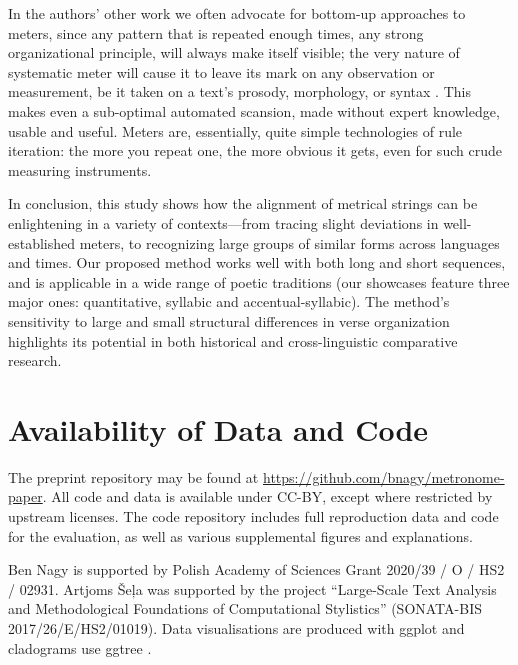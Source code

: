 \documentclass[
    hf
]{ceurart}
\begin{document}
In the authors' other work we often advocate for bottom-up approaches to meters, since any pattern that is repeated enough times, any strong organizational principle, will always make itself visible; the very nature of systematic meter will cause it to leave its mark on any observation or measurement, be it taken on a text's prosody, morphology, or syntax \cite{gasparov_linguistics_2008}. This makes even a sub-optimal automated scansion, made without expert knowledge, usable and useful. Meters are, essentially, quite simple technologies of rule iteration: the more you repeat one, the more obvious it gets, even for such crude measuring instruments.

In conclusion, this study shows how the alignment of metrical strings can be enlightening in a variety of contexts---from tracing slight deviations in well-established meters, to recognizing large groups of similar forms across languages and times. Our proposed method works well with both long and short sequences, and is applicable in a wide range of poetic traditions (our showcases feature three major ones: quantitative, syllabic and accentual-syllabic). The method's sensitivity to large and small structural differences in verse organization highlights its potential in both historical and cross-linguistic comparative research.

\section{Availability of Data and Code}\label{sec:data}

The preprint repository may be found at \url{https://github.com/bnagy/metronome-paper}. All code
and data is available under CC-BY, except where restricted by upstream licenses.
The code repository includes full reproduction data and code for the evaluation,
as well as various supplemental figures and explanations.

\FloatBarrier

\begin{acknowledgments}
    Ben Nagy is supported by Polish Academy of Sciences Grant
    2020/39 / O / HS2 / 02931. Artjoms Šeļa was supported by the project “Large-Scale Text Analysis and Methodological Foundations of Computational Stylistics” (SONATA-BIS 2017/26/E/HS2/01019). Data visualisations are produced with ggplot \cite{ggplot} and cladograms use ggtree \cite{ggtree}.
\end{acknowledgments}
\end{document}
